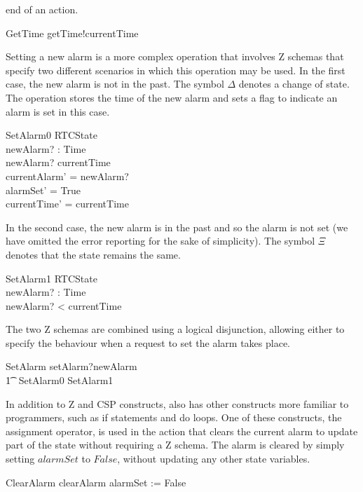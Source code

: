 \documentclass[a4paper,10pt]{report}
\begin{document}
end of an action.
%
\begin{circusaction}
  GetTime \circdef getTime!currentTime \then \Skip
\end{circusaction}
%
Setting a new alarm is a more complex operation that involves Z
schemas that specify two different scenarios in which this operation
may be used.
In the first case, the new alarm is not in the past.
The symbol $\Delta$ denotes a change of state.
The operation stores the time of the new alarm and sets a flag to
indicate an alarm is set in this case.
%
\begin{schema}{SetAlarm0}
  \Delta RTCState \\
  newAlarm?{} : Time \\
\where
  newAlarm?{} \geq currentTime \\
  currentAlarm' = newAlarm?{} \\
  alarmSet' = True \\
  currentTime' = currentTime \\
\end{schema}
%
In the second case, the new alarm is in the past and so the alarm is
not set (we have omitted the error reporting for the sake of
simplicity).
The symbol $\Xi$ denotes that the state remains the same.
%
\begin{schema}{SetAlarm1}
  \Xi RTCState \\
  newAlarm?{} : Time \\
\where
  newAlarm?{} < currentTime \\
\end{schema}
%
The two Z schemas are combined using a logical disjunction, allowing
either to specify the behaviour when a request to set the alarm takes
place.
%
\begin{circusaction}
  SetAlarm \circdef setAlarm?newAlarm \\
  \t1 \then\ \lschexpract SetAlarm0 \lor SetAlarm1 \rschexpract
\end{circusaction}
%
In addition to Z and CSP constructs, \Circus{} also has other
constructs more familiar to programmers, such as if statements and do
loops.
One of these constructs, the assignment operator, is used in the
action that clears the current alarm to update part of the state
without requiring a Z schema.
The alarm is cleared by simply setting $alarmSet$ to $False$, without
updating any other state variables.
%
\begin{circusaction}
  ClearAlarm \circdef clearAlarm \then alarmSet := False
\end{circusaction}
\end{document}
